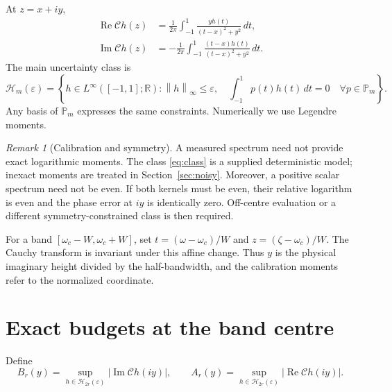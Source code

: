 \documentclass[11pt]{article}
\theoremstyle{remark}\newtheorem{remark}[theorem]{Remark}
\newcommand{\eps}{\varepsilon}
\newcommand{\C}{\mathcal C}
\newcommand{\Hcal}{\mathcal H}
\newcommand{\Real}{\operatorname{Re}}
\newcommand{\Imag}{\operatorname{Im}}
\newcommand{\norm}[1]{\left\lVert#1\right\rVert}
\begin{document}
At $z=x+iy$,
\begin{equation}\label{eq:components}
 \begin{split}
 \Real\C h(z)&=\frac{1}{2\pi}
       \int_{-1}^{1}\frac{yh(t)}{(t-x)^2+y^2}\,dt,\\
 \Imag\C h(z)&=-\frac{1}{2\pi}
       \int_{-1}^{1}\frac{(t-x)h(t)}{(t-x)^2+y^2}\,dt.
 \end{split}
\end{equation}
The main uncertainty class is
\begin{equation}\label{eq:class}
 \Hcal_m(\eps)=\left\{h\in L^\infty([-1,1];\mathbb R):
 \norm{h}_\infty\leq\eps,\quad
 \int_{-1}^{1}p(t)h(t)\,dt=0\quad \forall p\in\mathbb P_m\right\}.
\end{equation}
Any basis of $\mathbb P_m$ expresses the same constraints. Numerically we use
Legendre moments.

\begin{remark}[Calibration and symmetry]
A measured spectrum need not provide exact logarithmic moments.
The class \eqref{eq:class} is a supplied deterministic model; inexact moments
are treated in Section~\ref{sec:noisy}.
Moreover, a positive scalar spectrum need not be even.
If both kernels must be even, their relative logarithm is even and the phase
error at $iy$ is identically zero. Off-centre evaluation or a different
symmetry-constrained class is then required.
\end{remark}

For a band $[\omega_c-W,\omega_c+W]$, set $t=(\omega-\omega_c)/W$
and $z=(\zeta-\omega_c)/W$. The Cauchy transform is invariant under this
affine change. Thus $y$ is the physical imaginary height divided by the
half-bandwidth, and the calibration moments refer to the normalized coordinate.

\section{Exact budgets at the band centre}\label{sec:sharp}
Define
\[
 B_r(y)=\sup_{h\in\Hcal_{2r}(\eps)}|\Imag\C h(iy)|,\qquad
 A_r(y)=\sup_{h\in\Hcal_{2r}(\eps)}|\Real\C h(iy)|.
\]
\end{document}
